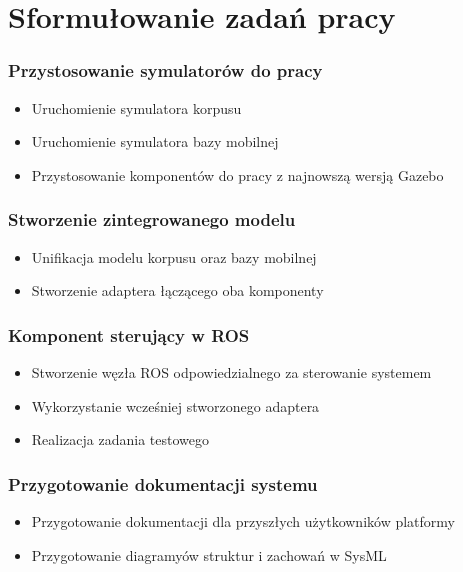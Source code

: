 \section{Sformułowanie zadań pracy}


\begin{frame}
	\frametitle{Przystosowanie symulatorów do pracy}
	\begin{itemize}
		\item Uruchomienie symulatora korpusu
		\item Uruchomienie symulatora bazy mobilnej
		\item Przystosowanie komponentów do pracy z najnowszą wersją Gazebo 
	\end{itemize}
\end{frame}


\begin{frame}
	\frametitle{Stworzenie zintegrowanego modelu}
	\begin{itemize}
		\item Unifikacja modelu korpusu oraz bazy mobilnej
		\item Stworzenie adaptera łączącego oba komponenty 
	\end{itemize}
\end{frame}


\begin{frame}
	\frametitle{Komponent sterujący w ROS}
	\begin{itemize}
		\item Stworzenie węzła ROS odpowiedzialnego za sterowanie systemem
		\item Wykorzystanie wcześniej stworzonego adaptera
		\item Realizacja zadania testowego
	\end{itemize}
\end{frame}


\begin{frame}
	\frametitle{Przygotowanie dokumentacji systemu}
	\begin{itemize}
		\item Przygotowanie dokumentacji dla przyszłych użytkowników platformy
		\item Przygotowanie diagramyów struktur i zachowań w SysML
	\end{itemize}
\end{frame}

